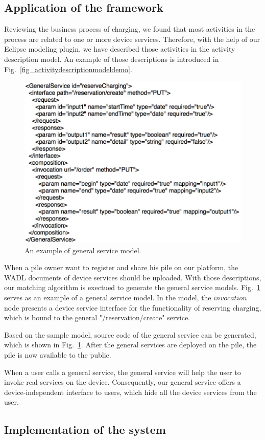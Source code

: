 \subsection{Application of the framework}
Reviewing the business process of charging, we found that most activities in the process are related to one or more device services. Therefore, with the help of our Eclipse modeling plugin, we have described those activities in the activity description model. An example of those descriptions is introduced in Fig.~\ref{fig_activitydescriptionmodeldemo}. 

\begin{figure}[!t]
\centering
\includegraphics[width=1.0\linewidth]{./graph/generalservicedemo}
\caption{An example of general service model.}
\label{fig_generalservicedemo}
\end{figure}

When a pile owner want to register and share his pile on our platform, the WADL documents of device services should be uploaded. With those descriptions, our matching algorithm is exectued to generate the general service models. Fig.~\ref{fig_generalservicedemo} serves as an example of a general service model.
In the model, the $invocation$ node presents a device service interface for the functionality of reserving charging, which is bound to the general "/reservation/create" service. 

Based on the sample model, source code of the general service can be generated, which is shown in Fig.~\ref{fig_generalservicedemo}. After the general services are deployed on the pile, the pile is now available to the public. 

When a user calls a general service, the general service will help the user to invoke real services on the device. Consequently, our general service offers a device-independent interface to users, which hide all the device services from the user. 

\subsection{Implementation of the system}
